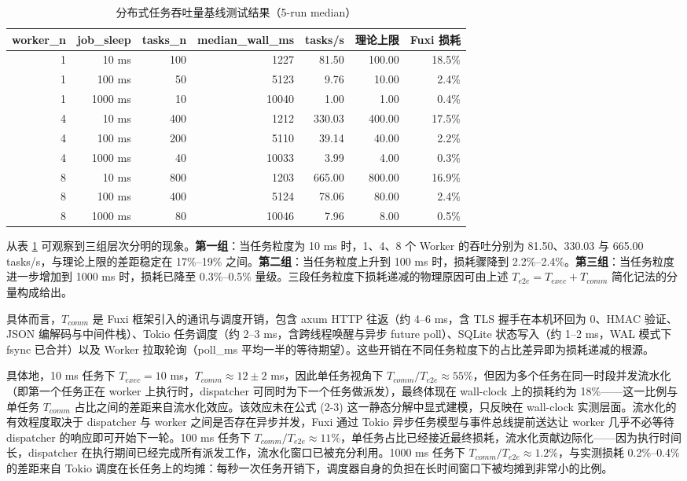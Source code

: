 \begin{table}[H]
\centering
\caption{分布式任务吞吐量基线测试结果（5-run median）}
\label{tab:throughput}
\begin{tabular}{rrrrrrr}
\toprule
worker\_n & job\_sleep & tasks\_n & median\_wall\_ms & tasks/s & 理论上限 & Fuxi 损耗 \\
\midrule
1 & 10 ms & 100 & 1227 & 81.50 & 100.00 & 18.5\% \\
1 & 100 ms & 50 & 5123 & 9.76 & 10.00 & 2.4\% \\
1 & 1000 ms & 10 & 10040 & 1.00 & 1.00 & 0.4\% \\
4 & 10 ms & 400 & 1212 & 330.03 & 400.00 & 17.5\% \\
4 & 100 ms & 200 & 5110 & 39.14 & 40.00 & 2.2\% \\
4 & 1000 ms & 40 & 10033 & 3.99 & 4.00 & 0.3\% \\
8 & 10 ms & 800 & 1203 & 665.00 & 800.00 & 16.9\% \\
8 & 100 ms & 400 & 5124 & 78.06 & 80.00 & 2.4\% \\
8 & 1000 ms & 80 & 10046 & 7.96 & 8.00 & 0.5\% \\
\bottomrule
\end{tabular}
\end{table}

从表 \ref{tab:throughput} 可观察到三组层次分明的现象。\textbf{第一组}：当任务粒度为 10 ms 时，1、4、8 个 Worker 的吞吐分别为 81.50、330.03 与 665.00 tasks/s，与理论上限的差距稳定在 17\%--19\% 之间。\textbf{第二组}：当任务粒度上升到 100 ms 时，损耗骤降到 2.2\%--2.4\%。\textbf{第三组}：当任务粒度进一步增加到 1000 ms 时，损耗已降至 0.3\%--0.5\% 量级。三段任务粒度下损耗递减的物理原因可由上述 $T_{e2e}=T_{exec}+T_{comm}$ 简化记法的分量构成给出。

具体而言，$T_{comm}$ 是 Fuxi 框架引入的通讯与调度开销，包含 axum HTTP 往返（约 4--6 ms，含 TLS 握手在本机环回为 0、HMAC 验证、JSON 编解码与中间件栈）、Tokio 任务调度（约 2--3 ms，含跨线程唤醒与异步 future poll）、SQLite 状态写入（约 1--2 ms，WAL 模式下 fsync 已合并）以及 Worker 拉取轮询（poll\_ms 平均一半的等待期望）。这些开销在不同任务粒度下的占比差异即为损耗递减的根源。

具体地，10 ms 任务下 $T_{exec} = 10$ ms，$T_{comm} \approx 12 \pm 2$ ms，因此单任务视角下 $T_{comm}/T_{e2e} \approx 55\%$，但因为多个任务在同一时段并发流水化（即第一个任务正在 worker 上执行时，dispatcher 可同时为下一个任务做派发），最终体现在 wall-clock 上的损耗约为 18\%——这一比例与单任务 $T_{comm}$ 占比之间的差距来自流水化效应。该效应未在公式 (2-3) 这一静态分解中显式建模，只反映在 wall-clock 实测层面。流水化的有效程度取决于 dispatcher 与 worker 之间是否存在异步并发，Fuxi 通过 Tokio 异步任务模型与事件总线提前送达让 worker 几乎不必等待 dispatcher 的响应即可开始下一轮。100 ms 任务下 $T_{comm}/T_{e2e} \approx 11\%$，单任务占比已经接近最终损耗，流水化贡献边际化——因为执行时间长，dispatcher 在执行期间已经完成所有派发工作，流水化窗口已被充分利用。1000 ms 任务下 $T_{comm}/T_{e2e} \approx 1.2\%$，与实测损耗 0.2\%--0.4\% 的差距来自 Tokio 调度在长任务上的均摊：每秒一次任务开销下，调度器自身的负担在长时间窗口下被均摊到非常小的比例。

